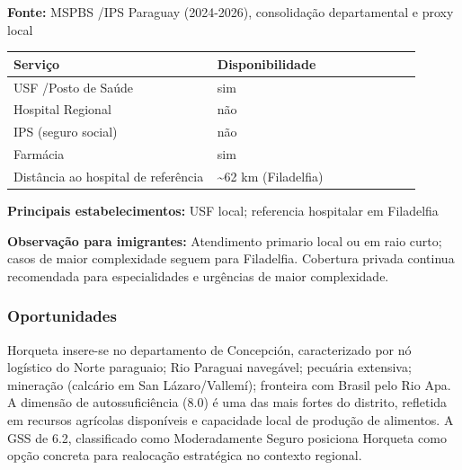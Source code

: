 \textbf{Fonte:} MSPBS /\allowbreak \allowbreak  IPS Paraguay (2024-2026), consolidação
departamental e proxy local

{\def\LTcaptype{none} %
\begin{longtable}{@{}>{\raggedright\arraybackslash}p{0.45\linewidth} >{\raggedright\arraybackslash}p{0.45\linewidth}@{}}
\toprule\noalign{}
Serviço & Disponibilidade \\
\midrule\noalign{}
\endhead
\bottomrule\noalign{}
\endlastfoot
USF /\allowbreak \allowbreak  Posto de Saúde & sim \\
Hospital Regional & não \\
IPS (seguro social) & não \\
Farmácia & sim \\
Distância ao hospital de referência & \textasciitilde62 km
(Filadelfia) \\
\end{longtable}
}

\textbf{Principais estabelecimentos:} USF local; referencia hospitalar
em Filadelfia

\textbf{Observação para imigrantes:} Atendimento primario local ou em
raio curto; casos de maior complexidade seguem para Filadelfia.
Cobertura privada continua recomendada para especialidades e urgências
de maior complexidade.
\newpage

\subsubsection*{Oportunidades}\label{oport-horqueta-0103}
Horqueta insere-se no departamento de Concepción, caracterizado por nó logístico do Norte paraguaio; Rio Paraguai navegável; pecuária extensiva; mineração (calcário em San Lázaro/Vallemí); fronteira com Brasil pelo Rio Apa. A dimensão de autossuficiência (8.0) é uma das mais fortes do distrito, refletida em recursos agrícolas disponíveis e capacidade local de produção de alimentos. A GSS de 6.2, classificado como Moderadamente Seguro posiciona Horqueta como opção concreta para realocação estratégica no contexto regional.

